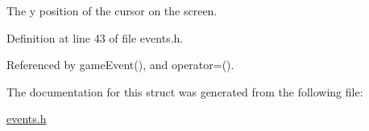 The y position of the cursor on the screen. 



Definition at line 43 of file events.\+h.



Referenced by game\+Event(), and operator=().



The documentation for this struct was generated from the following file\+:\begin{DoxyCompactItemize}
\item 
\hyperlink{events_8h}{events.\+h}\end{DoxyCompactItemize}

